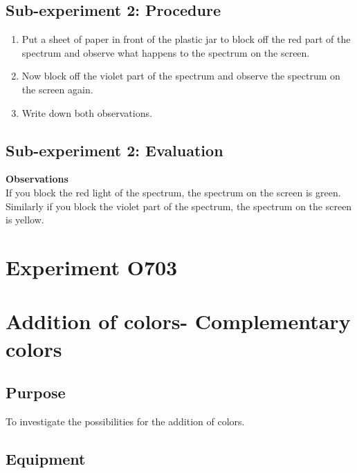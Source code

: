 \documentclass[12pt]{article}
\begin{document}
\subsection*{Sub-experiment 2: Procedure}
\begin{enumerate}
    \item Put a sheet of paper in front of the plastic jar to block off the red part of the spectrum and observe what happens to the spectrum on the screen. 
    \item Now block off the violet part of the spectrum and observe the spectrum on the screen again. 
    \item Write down both observations.
\end{enumerate}

\subsection*{Sub-experiment 2: Evaluation}
\textbf{Observations}\\
If you block the red light of the spectrum, the spectrum on the screen is green. Similarly if you block the violet part of the spectrum, the spectrum on the screen is yellow. 

\newpage

\section*{Experiment O703}

\section*{Addition of colors- Complementary colors}

\subsection*{Purpose}

To investigate the possibilities for the addition of colors.

\subsection*{Equipment}
\end{document}
